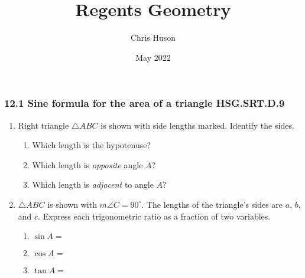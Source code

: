 \documentclass[12pt, twoside]{article}
\title{Regents Geometry}
\author{Chris Huson}
\date{May 2022}
\begin{document}
\subsubsection*{12.1 Sine formula for the area of a triangle \hfill HSG.SRT.D.9} %
\begin{enumerate}
\item Right triangle $\triangle ABC$ is shown with side lengths marked. Identify the sides. \vspace{0.5cm}
\begin{multicols}{2}
  \begin{enumerate}
    \item Which length is the hypotenuse?
    \item Which length is \emph{opposite} angle $A$?
    \item Which length is \emph{adjacent} to angle $A$?  \vspace{1cm}
  \end{enumerate}
\begin{flushright}
\end{flushright}
\end{multicols}

\item $\triangle ABC$ is shown with $m\angle C=90^\circ$. The lengths of the triangle's sides are $a$, $b$, and $c$. Express each trigonometric ratio as a fraction of two variables. \vspace{0.5cm}
\begin{multicols}{2}
      \begin{enumerate}
      \item $\sin A =$ \vspace{0.75cm}
      \item $\cos A =$ \vspace{0.75cm}
      \item $\tan A =$ \vspace{0.75cm}
    \end{enumerate}
\end{multicols}


\end{enumerate}
\end{document}
